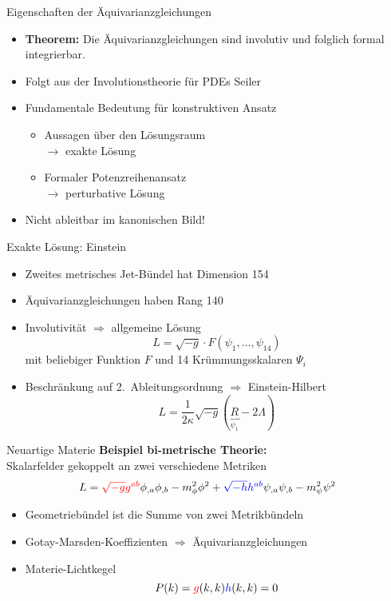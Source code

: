 \documentclass{beamer}
\begin{document}
    \begin{frame}{Eigenschaften der Äquivarianzgleichungen}
        \begin{itemize}
            \item \textbf{Theorem:} Die Äquivarianzgleichungen sind
            \alert{involutiv} und folglich \alert{formal integrierbar}.
            \item Folgt aus der Involutionstheorie für PDEs {\scriptsize \lbrack Seiler \rbrack}
            \item Fundamentale Bedeutung für konstruktiven Ansatz
            \begin{itemize}
                \item Aussagen über den Lösungsraum \\ $\rightarrow$ exakte Lösung
                \item Formaler Potenzreihenansatz \\ $\rightarrow$ perturbative Lösung
            \end{itemize}
            \item Nicht ableitbar im kanonischen Bild!
        \end{itemize}
    \end{frame}

    \begin{frame}{Exakte Lösung: Einstein}
        \begin{itemize}
            \item Zweites metrisches Jet-Bündel hat Dimension 154
            \item Äquivarianzgleichungen haben Rang 140
            \item Involutivität $\Rightarrow$ allgemeine Lösung
            \[ L = \sqrt{-g} \cdot F(\psi_1,\ldots,\psi_{14}) \]
            mit beliebiger Funktion $F$ und 14 Krümmungsskalaren $\Psi_i$
            \item Beschränkung auf 2.\ Ableitungsordnung $\Rightarrow$ \alert{Einstein-Hilbert}
            \[ L = \frac{1}{2\kappa}\sqrt{-g}(\underbrace{R}_{\psi_1} - 2\Lambda)\]
        \end{itemize}
    \end{frame}

    \begin{frame}{Neuartige Materie}
        \textbf{Beispiel bi-metrische Theorie:}\\ Skalarfelder gekoppelt an zwei verschiedene Metriken
            {\setlength{\belowdisplayskip}{-5pt}
        \[ L = {\color{red}\sqrt{-g} g^{ab}} \phi_{,a}\phi_{,b} - m_\phi^2 \phi^2 + {\color{blue}\sqrt{-h} h^{ab}} \psi_{,a}\psi_{,b} - m_\psi^2 \psi^2 \]}
        \begin{itemize}
            \item Geometriebündel ist die Summe von zwei Metrikbündeln
            \item Gotay-Marsden-Koeffizienten $\Rightarrow$ Äquivarianzgleichungen
            \item Materie-Lichtkegel
            \[ P(k) = {\color{red}g}(k,k) {\color{blue}h}(k,k) = 0 \]
        \end{itemize}
    \end{frame}
\end{document}
